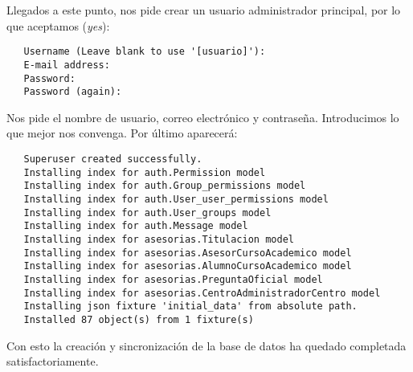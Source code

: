    Llegados a este punto, nos pide crear un usuario administrador principal, por
   lo que aceptamos (\textit{yes}):

   \begin{verbatim}
   Username (Leave blank to use '[usuario]'):
   E-mail address:
   Password:
   Password (again):
   \end{verbatim}

   Nos pide el nombre de usuario, correo electrónico y contraseña.
   Introducimos lo que mejor nos convenga. Por último aparecerá:

   \begin{verbatim}
   Superuser created successfully.
   Installing index for auth.Permission model
   Installing index for auth.Group_permissions model
   Installing index for auth.User_user_permissions model
   Installing index for auth.User_groups model
   Installing index for auth.Message model
   Installing index for asesorias.Titulacion model
   Installing index for asesorias.AsesorCursoAcademico model
   Installing index for asesorias.AlumnoCursoAcademico model
   Installing index for asesorias.PreguntaOficial model
   Installing index for asesorias.CentroAdministradorCentro model
   Installing json fixture 'initial_data' from absolute path.
   Installed 87 object(s) from 1 fixture(s)
   \end{verbatim}

   Con esto la creación y sincronización de la base de datos ha quedado
   completada satisfactoriamente.